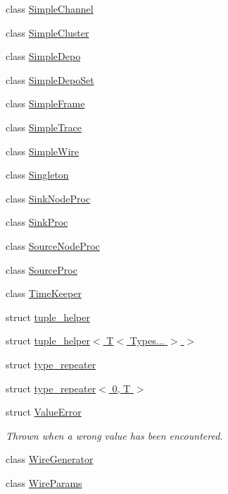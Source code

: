 \begin{DoxyCompactItemize}
class \hyperlink{class_wire_cell_1_1_simple_channel}{Simple\+Channel}
\item 
class \hyperlink{class_wire_cell_1_1_simple_cluster}{Simple\+Cluster}
\item 
class \hyperlink{class_wire_cell_1_1_simple_depo}{Simple\+Depo}
\item 
class \hyperlink{class_wire_cell_1_1_simple_depo_set}{Simple\+Depo\+Set}
\item 
class \hyperlink{class_wire_cell_1_1_simple_frame}{Simple\+Frame}
\item 
class \hyperlink{class_wire_cell_1_1_simple_trace}{Simple\+Trace}
\item 
class \hyperlink{class_wire_cell_1_1_simple_wire}{Simple\+Wire}
\item 
class \hyperlink{class_wire_cell_1_1_singleton}{Singleton}
\item 
class \hyperlink{class_wire_cell_1_1_sink_node_proc}{Sink\+Node\+Proc}
\item 
class \hyperlink{class_wire_cell_1_1_sink_proc}{Sink\+Proc}
\item 
class \hyperlink{class_wire_cell_1_1_source_node_proc}{Source\+Node\+Proc}
\item 
class \hyperlink{class_wire_cell_1_1_source_proc}{Source\+Proc}
\item 
class \hyperlink{class_wire_cell_1_1_time_keeper}{Time\+Keeper}
\item 
struct \hyperlink{struct_wire_cell_1_1tuple__helper}{tuple\+\_\+helper}
\item 
struct \hyperlink{struct_wire_cell_1_1tuple__helper_3_01_t_3_01_types_8_8_8_01_4_01_4}{tuple\+\_\+helper$<$ T$<$ Types... $>$ $>$}
\item 
struct \hyperlink{struct_wire_cell_1_1type__repeater}{type\+\_\+repeater}
\item 
struct \hyperlink{struct_wire_cell_1_1type__repeater_3_010_00_01_t_01_4}{type\+\_\+repeater$<$ 0, T $>$}
\item 
struct \hyperlink{struct_wire_cell_1_1_value_error}{Value\+Error}
\begin{DoxyCompactList}\small\item\em Thrown when a wrong value has been encountered. \end{DoxyCompactList}\item 
class \hyperlink{class_wire_cell_1_1_wire_generator}{Wire\+Generator}
\item 
class \hyperlink{class_wire_cell_1_1_wire_params}{Wire\+Params}
\item 

\end{DoxyCompactItemize}
